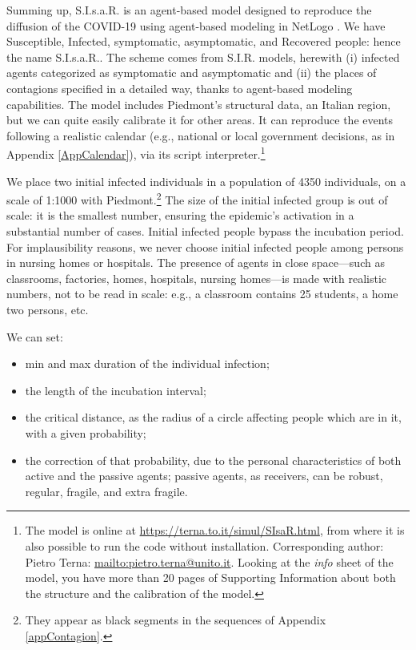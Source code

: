\documentclass[11pt]{article}
\begin{document}
Summing up, S.I.s.a.R. \citep{SIsaR} is an agent-based model designed to reproduce the diffusion of the COVID-19 using agent-based modeling in NetLogo \citep{NetLogo}. We have Susceptible, Infected, symptomatic, asymptomatic, and Recovered people: hence the name S.I.s.a.R.. The scheme comes from S.I.R. models, herewith (i) infected agents categorized as symptomatic and asymptomatic and (ii) the places of contagions specified in a detailed way, thanks to agent-based modeling capabilities. The model includes Piedmont's structural data, an Italian region, but we can quite easily calibrate it for other areas. It can reproduce the events following a realistic calendar (e.g., national or local government decisions, as in Appendix \ref{AppCalendar}), via its script interpreter.\footnote{\label{modOnLine}The model is online at \url{https://terna.to.it/simul/SIsaR.html}, from where it is also possible to run the code without installation. Corresponding author: Pietro Terna: \url{mailto:pietro.terna@unito.it}. Looking at the \emph{info} sheet of the model, you have more than 20 pages of Supporting Information about both the structure and the calibration of the model.}

We place two initial infected individuals in a population of 4350 individuals, on a scale of 1:1000 with Piedmont.\footnote{They appear as black segments in the sequences of Appendix \ref{appContagion}.} The size of the initial infected group is out of scale: it is the smallest number, ensuring the epidemic's activation in a substantial number of cases. Initial infected people bypass the incubation period. For implausibility reasons, we never choose initial infected people among persons in nursing homes or hospitals. The presence of agents in close space---such as classrooms, factories, homes, hospitals, nursing homes---is made with realistic numbers, not to be read in scale: e.g., a classroom contains 25 students, a home two persons, etc.

We can set: 
\begin{itemize}
\setlength\itemsep{0.3em}
\item min and max duration of the individual infection;

\item the length of the incubation interval;

\item the critical distance, as the radius of a circle affecting people which are in it, with a given probability;

\item the correction of that probability, due to the personal characteristics of both active and the passive agents; passive agents, as receivers, can be robust, regular, fragile, and extra fragile.

\end{itemize} 
\end{document}
